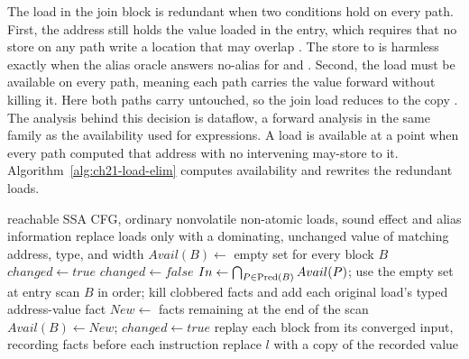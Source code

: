 The load in the join block is redundant when two conditions hold on every path.
First, the address  still holds the value loaded in the entry, which requires that no store on any path write a location that may overlap .
The store to  is harmless exactly when the alias oracle answers no-alias for  and .
Second, the load must be available on every path, meaning each path carries the value forward without killing it.
Here both paths carry  untouched, so the join load reduces to the copy .
The analysis behind this decision is  dataflow, a forward analysis in the same family as the availability used for expressions.
A load is available at a point when every path computed that address with no intervening may-store to it.
Algorithm~\ref{alg:ch21-load-elim} computes availability and rewrites the redundant loads.

\begin{algorithm}
  \caption{Redundant load elimination with alias kills}\label{alg:ch21-load-elim}
  \begin{pseudocode}
    \Require reachable SSA CFG, ordinary nonvolatile non-atomic loads, sound effect and alias information
    \Ensure replace loads only with a dominating, unchanged value of matching address, type, and width
    \State $Avail(B) \gets$ empty set for every block $B$
    \State $changed \gets true$
      \State $changed \gets false$
        \State $In \gets \bigcap_{P \in \operatorname{Pred}(B)} Avail(P)$; use the empty set at entry
        \State scan $B$ in order; kill clobbered facts and add each original load's typed address-value fact
        \State $New \gets$ facts remaining at the end of the scan
          \State $Avail(B) \gets New$; $changed \gets true$
        \EndIf
      \EndFor
    \EndWhile
    \State replay each block from its converged input, recording facts before each instruction
        \State replace $l$ with a copy of the recorded value
      \EndIf
    \EndFor
  \end{pseudocode}
\end{algorithm}

